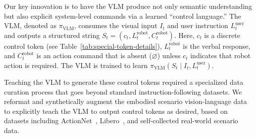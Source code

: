 Our key innovation is to have the VLM produce not only semantic understanding but also explicit system-level commands via a learned “control language.” The VLM, denoted as $\pi_{\text{VLM}}$, consumes the visual input $I_t$ and user instruction $L_t^{\text{user}}$ and outputs a structured string $S_t=(c_t, L_t^{\text{robot}}, C_t^{\text{robot}})$. Here, $c_t$ is a discrete control token (see Table~\ref{tab:special-token-details}), $L_t^{\text{robot}}$ is the verbal response, and $C_t^{\text{robot}}$ is an action command that is absent ($\varnothing$) unless $c_t$ indicates that robot action is required. The VLM is trained to learn $\pi_{\text{VLM}}(S_t \mid I_t, L_t^{\text{user}})$.

\begin{table}[thb!]
    \vspace{-1.5em}
    \caption{Special tokens used to control the VITA-E framework's behavior.}
    \label{tab:special-token-details}
    \centering
    \vspace{-1.5em}
\end{table}

Teaching the VLM to generate these control tokens required a specialized data curation process that goes beyond standard instruction-following datasets. We reformat and synthetically augment the embodied scenario vision-language data to explicitly teach the VLM to output control tokens as desired, based on datasets including ActionNet~\citep{fourier2025actionnet}, Libero~\citep{liu2023libero}, and self-collected real-world scenario data.

